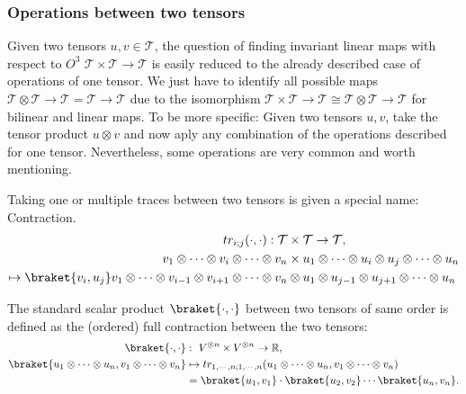 \subsubsection{Operations between two tensors}
Given two tensors $u,v \in \mathcal{T}$, the question of finding invariant linear maps with respect to $O^3$ $\mathcal{T} \times \mathcal{T} \to \mathcal{T}$ is easily reduced to the already described case of operations of one tensor. We just have to identify all possible maps $\mathcal{T} \otimes \mathcal{T} \to \mathcal{T} = \mathcal{T} \to \mathcal{T}$ due to the isomorphism $\mathcal{T} \times \mathcal{T} \to \mathcal{T} \cong \mathcal{T} \otimes \mathcal{T} \to \mathcal{T}$ for bilinear and linear maps. To be more specific: Given two tensors $u,v$, take the tensor product $u\otimes v$ and now aply any combination of the operations described for one tensor. Nevertheless, some operations are very common and worth mentioning.

\begin{definition}
	Taking one or multiple traces between two tensors is given a special name: Contraction.
	\begin{align*}
		tr_{i;j} (\cdot,\cdot): \mathcal{T} &\times \mathcal{T} \to \mathcal{T},
		\\
		v_1 \otimes \cdots \otimes v_i \otimes \cdots\otimes v_n &\times u_1 \otimes \cdots \otimes u_i \otimes u_j \otimes \cdots \otimes u_n 
		\\
		\mapsto \braket{v_i,u_j} v_1 \otimes \cdots \otimes v_{i-1}\otimes v_{i+1} \otimes \cdots \otimes v_n &\otimes u_1 \otimes u_{j-1} \otimes u_{j+1} \otimes \cdots \otimes u_n
	\end{align*}
\end{definition}
\begin{definition}
	The standard scalar product $\braket{\cdot,\cdot}$ between two tensors of same order is defined as the (ordered) full contraction between the two tensors:
	\begin{align*}
		\braket{\cdot,\cdot} &: \  V^{\otimes n} \times V^{\otimes n} \to \IR,\\
		\braket{u_1 \otimes \cdots \otimes u_n,v_1 \otimes \cdots \otimes v_n} &\mapsto tr_{1,\cdots,n;1,\cdots,n} (u_1 \otimes \cdots \otimes u_n,v_1 \otimes \cdots \otimes v_n) \\
		&= \braket{u_1,v_1}\cdot\braket{u_2,v_2} \cdots \braket{u_n,v_n}.
	\end{align*}
\end{definition}
